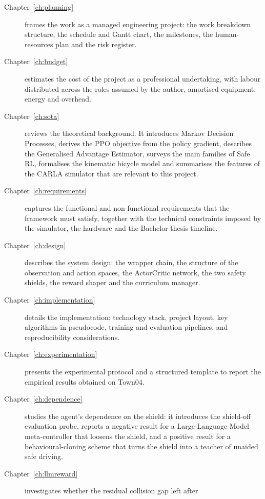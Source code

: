 \begin{description}
  \item[Chapter~\ref{ch:planning}] frames the work as a managed engineering project: the work
        breakdown structure, the schedule and Gantt chart, the milestones, the human-resources
        plan and the risk register.
  \item[Chapter~\ref{ch:budget}] estimates the cost of the project as a professional undertaking,
        with labour distributed across the roles assumed by the author, amortised equipment,
        energy and overhead.
  \item[Chapter~\ref{ch:sota}] reviews the theoretical background. It introduces Markov Decision
        Processes, derives the PPO objective from the policy gradient, describes the Generalised
        Advantage Estimator, surveys the main families of Safe RL, formalises the kinematic
        bicycle model and summarises the features of the CARLA simulator that are relevant to
        this project.
  \item[Chapter~\ref{ch:requirements}] captures the functional and non-functional requirements
        that the framework must satisfy, together with the technical constraints imposed by the
        simulator, the hardware and the Bachelor-thesis timeline.
  \item[Chapter~\ref{ch:design}] describes the system design: the wrapper chain, the structure
        of the observation and action spaces, the Actor\textendash Critic network, the two
        safety shields, the reward shaper and the curriculum manager.
  \item[Chapter~\ref{ch:implementation}] details the implementation: technology stack, project
        layout, key algorithms in pseudocode, training and evaluation pipelines, and
        reproducibility considerations.
  \item[Chapter~\ref{ch:experimentation}] presents the experimental protocol and a structured
        template to report the empirical results obtained on Town04.
  \item[Chapter~\ref{ch:dependence}] studies the agent's dependence on the shield: it introduces
        the shield-off evaluation probe, reports a negative result for a Large-Language-Model
        meta-controller that loosens the shield, and a positive result for a behavioural-cloning
        scheme that turns the shield into a teacher of unaided safe driving.
  \item[Chapter~\ref{ch:llmreward}] investigates whether the residual collision gap left after

\end{description}
